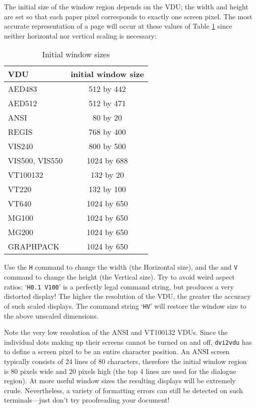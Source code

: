 The initial size of the window region depends on the VDU; the width and height
are set so that each paper pixel corresponds to exactly one screen pixel.
The most accurate representation of a page will occur at these values of Table
\ref{table:windowsize} since
neither horizontal nor vertical scaling is necessary:
\begin{table}[htb]
\begin{center}
\begin{tabular}{lc}
VDU&initial window size \\
\hline
AED483&             512 by 442\\
AED512&             512 by 471\\
ANSI&                80 by 20\\
REGIS&              768 by 400\\
VIS240&             800 by 500\\
VIS500, VIS550&    1024 by 688\\
VT100132&           132 by 20\\
VT220&              132 by 100\\
VT640&             1024 by 650\\
MG100&             1024 by 650\\
MG200&             1024 by 650\\
GRAPHPACK&         1024 by 650\\
\end{tabular}
\caption{Initial window sizes}
\label{table:windowsize}
\end{center}
\end{table}

Use the {\tt H} command to change the width (the Horizontal size), and the
and {\tt V} command to change the height (the Vertical size).
Try to avoid weird aspect ratios: `{\tt H0.1 V100}' is a perfectly legal
command string, but produces a very distorted display!
The higher the resolution of the VDU,
the greater the accuracy of such scaled displays.
The command string `{\tt HV}' will restore the window size to the above unscaled
dimensions.

Note the very low resolution of the ANSI and VT100132 VDUs.
Since the individual dots making up their screens cannot be turned on and off,
{\tt dvi2vdu} has to define a screen pixel to be an entire character position.
An ANSI screen typically consists of 24 lines of 80 characters,
therefore the initial window region is 80 pixels wide and 20 pixels high
(the top 4 lines are used for the dialogue region).
At more useful window sizes the resulting displays will be extremely crude.
Nevertheless, a variety of formatting errors can still be detected on such
terminals---just don't try proofreading your document!

